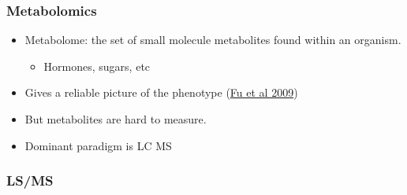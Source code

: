 

\begin{frame}
	\frametitle{Metabolomics}
	\begin{itemize}
		\item Metabolome: the set of small molecule metabolites found within an organism.
		\begin{itemize}
			\item Hormones, sugars, etc 
		\end{itemize}
		\item Gives a reliable picture of the phenotype (\href{http://www.nature.com/ng/journal/v41/n2/abs/ng.308.html}{Fu et al 2009})
		\item But metabolites are hard to measure.
		\item Dominant paradigm is \ac{LC} \ac{MS}
	\end{itemize}
\end{frame}

\begin{frame}
	\frametitle{\ac{LS}/\ac{MS}}
	
\end{frame}